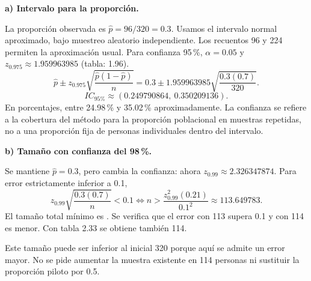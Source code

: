 \textbf{a) Intervalo para la proporción.}\par\nopagebreak[4]
La proporción observada es $\widehat p=96/320=0.3$. Usamos el intervalo normal aproximado, bajo muestreo aleatorio independiente. Los recuentos 96 y 224 permiten la aproximación usual. Para confianza 95\,\%, $\alpha=0.05$ y $z_{0.975}\approx1.959963985$ (tabla: 1.96).
\[
\widehat p\pm z_{0.975}\sqrt{\frac{\widehat p(1-\widehat p)}n}
=0.3\pm1.959963985\sqrt{\frac{0.3(0.7)}{320}}.
\]
\[
\boxed{IC_{\text{95\%}}\approx(0.249790864,\ 0.350209136).}
\]
En porcentajes, entre 24.98\,\% y 35.02\,\% aproximadamente. La confianza se refiere a la cobertura del método para la proporción poblacional en muestras repetidas, no a una proporción fija de personas individuales dentro del intervalo.

\textbf{b) Tamaño con confianza del 98\,\%.}\par\nopagebreak[4]
Se mantiene $\widehat p=0.3$, pero cambia la confianza: ahora $z_{0.99}\approx2.326347874$. Para error estrictamente inferior a 0.1,
\[
z_{0.99}\sqrt{\frac{0.3(0.7)}n}<0.1
\iff n>\frac{z_{0.99}^2(0.21)}{0.1^2}
\approx113.649783.
\]
El tamaño total mínimo es . Se verifica que el error con 113 supera 0.1 y con 114 es menor. Con tabla 2.33 se obtiene también 114.

Este tamaño puede ser inferior al inicial 320 porque aquí se admite un error mayor. No se pide aumentar la muestra existente en 114 personas ni sustituir la proporción piloto por 0.5.
